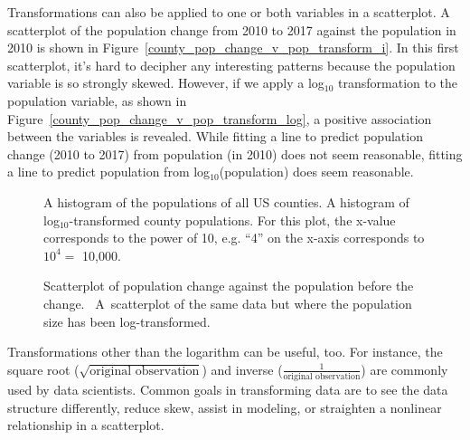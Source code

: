 Transformations can also be applied to one or both
variables in a scatterplot.
A scatterplot of the population change from 2010 to 2017
against the population in 2010 is shown in Figure~\ref{county_pop_change_v_pop_transform_i}.
In this first scatterplot, it's hard to decipher any
interesting patterns because the population variable
is so strongly skewed.
However, if we apply a log$_{10}$ transformation to
the population variable, as shown in
Figure~\ref{county_pop_change_v_pop_transform_log},
a positive association between the variables is revealed.
While fitting a line to predict population change (2010 to 2017) from population (in 2010) does not seem reasonable, fitting a line to predict population from log$_{10}$(population) does seem reasonable.  


\begin{figure}[p]
    \label{county_pop_transformed}
  \centering
  \caption{ A histogram of
      the populations of all US counties.
       A histogram of
      log$_{10}$-transformed county populations.
      For this plot, the x-value corresponds to the power
      of 10, e.g. ``4'' on the x-axis corresponds to
      $10^4 =$ 10,000.}
\end{figure}

\begin{figure}[p]
  \centering
  \caption{
      Scatterplot of population change
      against the population before the change.
      ~A~scatterplot
      of the same data but where the population
      size has been log-transformed.}
  \label{county_pop_change_v_pop_transform_main}
\end{figure}

Transformations other than the logarithm can be useful, too.
For instance, the square root
($\sqrt{\text{original observation}}$) and inverse
($\frac{1}{\text{original observation}}$) are commonly used
by data scientists.
Common goals in transforming data are to see the data
structure differently, reduce skew, assist in modeling,
or straighten a nonlinear relationship in a scatterplot.

